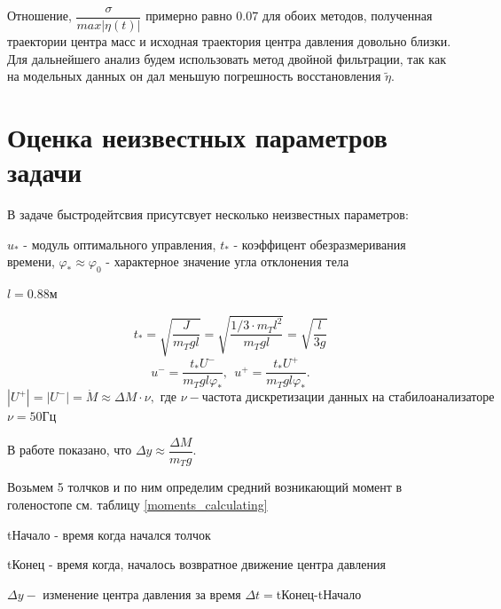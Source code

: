 \documentclass[a4paper,12pt, openany]{book}
\theoremstyle{plain} %
\theoremstyle{definition} %
\theoremstyle{remark} %
\numberwithin{equation}{chapter}
\begin{document}
{Отношение, $\dfrac{\sigma}{max|\eta(t)|}$ примерно равно $0.07$ для обоих методов, полученная траектории центра масс и исходная траектория 
центра давления довольно близки. Для дальнейшего анализ будем использовать метод двойной фильтрации, 
так как на модельных данных он дал меньшую погрешность восстановления $\tilde{\eta}$.

\section{Оценка неизвестных параметров задачи}

В задаче быстродейтсвия присутсвует несколько неизвестных параметров:

$u_*$ - модуль оптимального управления,
$t_*$ - коэффицент обезразмеривания времени,
$\varphi_*\approx\varphi_0$ - характерное значение угла отклонения тела


$l=0.88$м

$$t_\ast=\sqrt{\frac{J}{m_Tgl}}=\sqrt{\frac{1/3 \cdot m_T l^2}{m_Tgl}}=\sqrt{\frac{l}{3g}}$$
\[
    u^-=\frac{t_\ast U^-}{m_Tgl\varphi_\ast },\ \ u^+=\frac{t_\ast U^+}{m_Tgl\varphi_\ast}.
\]
$|U^+|=|U^-|=\dot M\approx \Delta M \cdot \nu, \text{ где } \nu - \text{частота дискретизации данных на стабилоанализаторе } $
$\nu =50\text{Гц}$

В работе \cite{kruchinMetoda} показано, что $\Delta y\approx\dfrac{\Delta M}{m_Tg}$.

Возьмем 5 толчков и по ним определим средний возникающий момент в голеностопе см. таблицу \ref*{moments_calculating}

tНачало - время когда начался толчок

tКонец - время когда, началось возвратное движение центра давления

$\Delta y - $ изменение центра давления за время $\Delta t = $tКонец-tНачало

}
\end{document}

